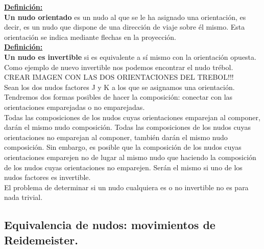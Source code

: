 \documentclass[14pt]{extarticle}
\begin{document}
   \underline{\textbf{ Definición:}}\\
   \textbf{ Un nudo orientado} es un nudo al que se le ha asignado una orientación, es decir, es un nudo que dispone de una dirección de viaje sobre él mismo. Esta orientación se indica mediante flechas en la proyección. \\
   
   \underline{\textbf{ Definición:}}\\
   \textbf{ Un nudo es invertible} si es equivalente a sí mismo con la orientación opuesta. \\
   
   Como ejemplo de nuevo invertible nos podemos encontrar el nudo trébol.
   \\CREAR IMAGEN CON LAS DOS ORIENTACIONES DEL TREBOL!!!\\
   
   Sean los dos nudos factores J y K a los que se asignamos una orientación. Tendremos dos formas posibles de hacer la composición: conectar con las orientaciones emparejadas o no emparejadas. \\
   Todas las composiciones de los nudos cuyas orientaciones emparejan al componer, darán el mismo nudo composición. Todas las composiciones de los nudos cuyas orientaciones no emparejan al componer, también darán el mismo nudo composición. Sin embargo, es posible que la composición de los nudos cuyas orientaciones emparejen no de lugar al mismo nudo que haciendo la composición de los nudos cuyas orientaciones no emparejen. Serán el mismo si uno de los nudos factores es invertible.\\
   
   El problema de determinar si un nudo cualquiera es o no invertible no es para nada trivial. 
    
    
  
  
  
  
  

\subsection{Equivalencia de nudos: movimientos de Reidemeister.}
\end{document}
